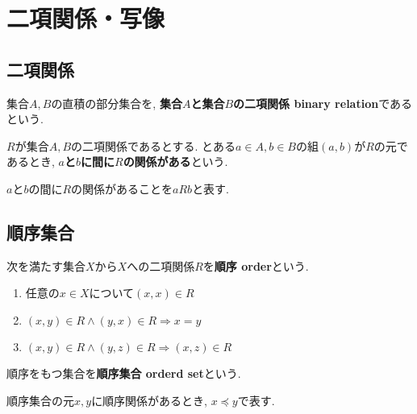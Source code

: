\section{二項関係・写像}
\subsection{二項関係}
\begin{Def}
集合$A,B$の直積の部分集合を, {\bf 集合$A$と集合$B$の二項関係 binary relation}であるという.
\end{Def}
\begin{Def}
$R$が集合$A,B$の二項関係であるとする. 
とある$a\in A, b\in B$の組$(a,b)$が$R$の元であるとき,
{\bf $a$と$b$に間に$R$の関係がある}という.
\end{Def}
\begin{Notation}
$a$と$b$の間に$R$の関係があることを$aRb$と表す.
\end{Notation}
\subsection{順序集合}
\begin{Def}
次を満たす集合$X$から$X$への二項関係$R$を{\bf 順序 order}という.
\begin{enumerate}
\item 任意の$x\in X$について$(x,x)\in R$
\item $(x,y)\in R\land(y,x)\in R\Rightarrow x=y$
\item $(x,y)\in R\land (y,z)\in R
\Rightarrow (x,z)\in R$
\end{enumerate}
\end{Def}
\begin{Def}
順序をもつ集合を{\bf 順序集合 orderd set}という.
\end{Def}
\begin{Notation}
順序集合の元$x,y$に順序関係があるとき, $x\preceq y$で表す.
\end{Notation}

